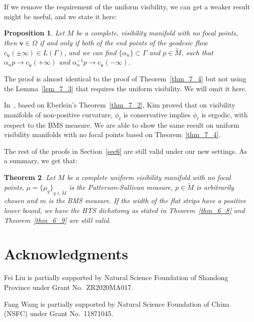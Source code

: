 \documentclass[reqno,11pt]{article}
\newtheorem{theorem}{Theorem}[section]
\newtheorem{proposition}[theorem]{Proposition}
\theoremstyle{definition}
\theoremstyle{remark}
\numberwithin{equation}{section}
\begin{document}
If we remove the requirement of the uniform visibility, we can get a weaker result might be useful, and we state it here:

\begin{proposition}\label{prop_7_5}
	Let $M$ be a complete, visibility manifold with no focal points, then $\bm{v}\in\Omega$ if and only if both of the end points of the geodesic flow $c_{\bm{\widetilde{v}}}(\pm\infty)\in L(\Gamma)$, and we can find $\{\alpha_n\}\subset\Gamma$ and $p\in\widetilde{M}$, such that $\alpha_n p\to c_{\bm{\widetilde{v}}}(+\infty)$ and $\alpha_n^{-1}p\to c_{\bm{\widetilde{v}}}(-\infty)$.
\end{proposition}

The proof is almost identical to the proof of Theorem~\ref{thm_7_4} but not using the Lemma~\ref{lem_7_3} that requires the uniform visibility. We will omit it here.

In~\cite{Ki}, based on Eberlein's Theorem~\ref{thm_7_2}, Kim proved that on visibility manifolds of non-positive curvature, $\phi_t$ is conservative implies $\phi_t$ is ergodic, with respect to the BMS measure. We are able to show the same result on uniform visibility manifolds with no focal points based on Theorem~\ref{thm_7_4}.

The rest of the proofs in Section~\ref{sec6} are still valid under our new settings. As a summary, we get that:

\begin{theorem}\label{thm_7_6}
    Let $M$ be a complete uniform visibility manifold with no focal points, $\mu={\{\mu_q\}}_{q\in\widetilde{M}}$ is the Patterson-Sullivan measure, $p\in\widetilde{M}$ is arbitrarily chosen and $m$ is the BMS measure. If the width of the flat strips have a positive lower bound, we have the HTS dichotomy as stated in Theorem~\ref{thm_6_8} and Theorem~\ref{thm_6_9} are still valid.
\end{theorem}



\section*{Acknowledgments}

Fei Liu is partially supported by Natural Science Foundation of Shandong Province under Grant No.~ZR2020MA017.

Fang Wang is partially supported by Natural Science Foundation of China (NSFC) under Grant No.~11871045.



\end{document}
